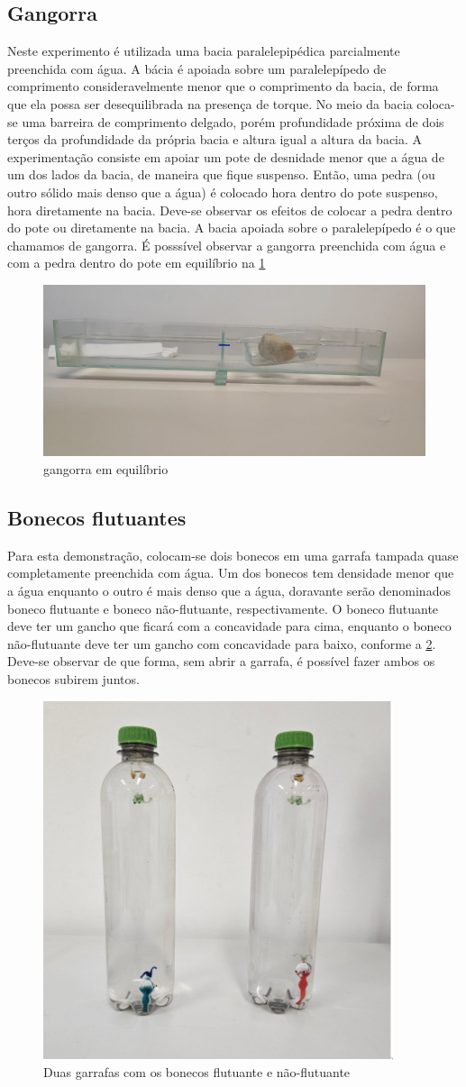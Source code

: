 \subsection{Gangorra}
Neste experimento é utilizada uma bacia paralelepipédica parcialmente preenchida
com água. A bácia é apoiada sobre um paralelepípedo de comprimento
consideravelmente menor que o comprimento da bacia, de forma que ela possa ser
desequilibrada na presença de torque. No meio da bacia coloca-se uma barreira de
comprimento delgado, porém profundidade próxima de dois terços da profundidade
da própria bacia e altura igual a altura da bacia. A experimentação consiste em
apoiar um pote de desnidade menor que a água de um dos lados da bacia, de
maneira que fique suspenso. Então, uma pedra (ou outro sólido mais denso que a
água) é colocado hora dentro do pote suspenso, hora diretamente na bacia.
Deve-se observar os efeitos de colocar a pedra dentro do pote ou diretamente na
bacia. A bacia apoiada sobre o paralelepípedo é o que chamamos de gangorra. É posssível observar 
a gangorra preenchida com água e com a pedra dentro do pote em equilíbrio na \cref{gangorra.png}  
\begin{figure}[H]
    \centering
    \includegraphics[width=.35\linewidth]{fig/gangorra.jpeg}
    \caption{gangorra em equilíbrio}
    \label{gangorra.png}
\end{figure}

\subsection{Bonecos flutuantes}
Para esta demonstração, colocam-se dois bonecos em uma garrafa tampada quase
completamente preenchida com água. Um dos bonecos tem densidade menor que a água
enquanto o outro é mais denso que a água, doravante serão denominados boneco 
flutuante e boneco não-flutuante, respectivamente. O boneco flutuante deve
ter um gancho que ficará com a concavidade para cima, enquanto o boneco não-flutuante
deve ter um gancho com concavidade para baixo, conforme a \cref{bonecos.png}. Deve-se observar de que
forma, sem abrir a garrafa, é possível fazer ambos os bonecos subirem juntos. 
\begin{figure}[H]
    \centering
    \includegraphics[width=.25\linewidth]{fig/bonecos.png}
    \caption{Duas garrafas com os bonecos flutuante e não-flutuante}
    \label{bonecos.png}
\end{figure}

